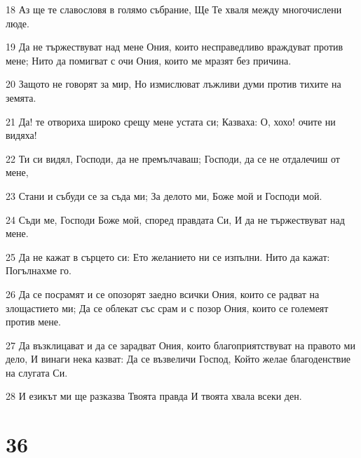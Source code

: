 \par 18 Аз ще те славословя в голямо събрание, Ще Те хваля между многочислени люде.
\par 19 Да не тържествуват над мене Ония, които несправедливо враждуват против мене; Нито да помигват с очи Ония, които ме мразят без причина.
\par 20 Защото не говорят за мир, Но измислюват лъжливи думи против тихите на земята.
\par 21 Да! те отвориха широко срещу мене устата си; Казваха: О, хохо! очите ни видяха!
\par 22 Ти си видял, Господи, да не премълчаваш; Господи, да се не отдалечиш от мене,
\par 23 Стани и събуди се за съда ми; За делото ми, Боже мой и Господи мой.
\par 24 Съди ме, Господи Боже мой, според правдата Си, И да не тържествуват над мене.
\par 25 Да не кажат в сърцето си: Ето желанието ни се изпълни. Нито да кажат: Погълнахме го.
\par 26 Да се посрамят и се опозорят заедно всички Ония, които се радват на злощастието ми; Да се облекат със срам и с позор Ония, които се големеят против мене.
\par 27 Да възклицават и да се зарадват Ония, които благоприятствуват на правото ми дело, И винаги нека казват: Да се възвеличи Господ, Който желае благоденствие на слугата Си.
\par 28 И езикът ми ще разказва Твоята правда И твоята хвала всеки ден.

\chapter{36}

